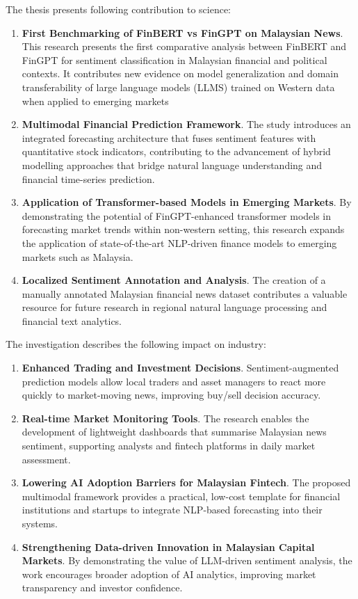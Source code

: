 \documentclass[singlespace]{ucetd}
\begin{document}
The thesis presents following contribution to science:
\begin{enumerate}
    \item \textbf{First Benchmarking of FinBERT vs FinGPT on Malaysian News}. This research presents the first comparative analysis between FinBERT and FinGPT for sentiment classification in Malaysian financial and political contexts. It contributes new evidence on model generalization and domain transferability of large language models (LLMS) trained on Western data when applied to emerging markets
    
    \item \textbf{Multimodal Financial Prediction Framework}. The study introduces an integrated forecasting architecture that fuses sentiment features with quantitative stock indicators, contributing to the advancement of hybrid modelling approaches that bridge natural language understanding and financial time-series prediction.
    
    \item \textbf{Application of Transformer-based Models in Emerging Markets}. By demonstrating the potential of FinGPT-enhanced transformer models in forecasting market trends within non-western setting, this research expands the application of state-of-the-art NLP-driven finance models to emerging markets such as Malaysia.
    
    \item \textbf{Localized Sentiment Annotation and Analysis}. The creation of a manually annotated Malaysian financial news dataset contributes a valuable resource for future research in regional natural language processing and financial text analytics.
\end{enumerate}

The investigation describes the following impact on industry:
\begin{enumerate}
    \item \textbf{Enhanced Trading and Investment Decisions}.
    Sentiment-augmented prediction models allow local traders and asset managers to react more quickly to market-moving news, improving buy/sell decision accuracy.
    
    \item \textbf{Real-time Market Monitoring Tools}.
    The research enables the development of lightweight dashboards that summarise Malaysian news sentiment, supporting analysts and fintech platforms in daily market assessment.
    
    \item \textbf{Lowering AI Adoption Barriers for Malaysian Fintech}.
    The proposed multimodal framework provides a practical, low-cost template for financial institutions and startups to integrate NLP-based forecasting into their systems.
    
    \item \textbf{Strengthening Data-driven Innovation in Malaysian Capital Markets}.
    By demonstrating the value of LLM-driven sentiment analysis, the work encourages broader adoption of AI analytics, improving market transparency and investor confidence.
\end{enumerate}
\end{document}
